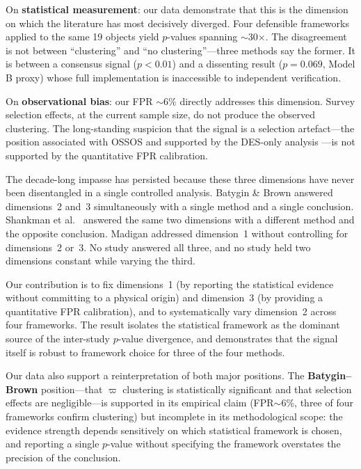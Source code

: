 \documentclass[12pt,a4paper]{article}
\begin{document}
On \textbf{statistical measurement}: our data demonstrate that this is the dimension on which the literature has most decisively diverged. Four defensible frameworks applied to the same 19 objects yield $p$-values spanning $\sim$30$\times$. The disagreement is not between ``clustering'' and ``no clustering''---three methods say the former. It is between a consensus signal ($p<0.01$) and a dissenting result ($p=0.069$, Model B proxy) whose full implementation is inaccessible to independent verification.

On \textbf{observational bias}: our FPR $\sim6\%$ directly addresses this dimension. Survey selection effects, at the current sample size, do not produce the observed clustering. The long-standing suspicion that the signal is a selection artefact---the position associated with OSSOS \cite{shankman2017} and supported by the DES-only analysis \cite{bernardinelli2020}---is not supported by the quantitative FPR calibration.

The decade-long impasse has persisted because these three dimensions have never been disentangled in a single controlled analysis. Batygin \& Brown \cite{batygin2016,brown2019} answered dimensions~2 and~3 simultaneously with a single method and a single conclusion. Shankman et al.\ \cite{shankman2017} answered the same two dimensions with a different method and the opposite conclusion. Madigan \cite{madigan2018} addressed dimension~1 without controlling for dimensions~2 or~3. No study answered all three, and no study held two dimensions constant while varying the third.

Our contribution is to fix dimensions~1 (by reporting the statistical evidence without committing to a physical origin) and dimension~3 (by providing a quantitative FPR calibration), and to systematically vary dimension~2 across four frameworks. The result isolates the statistical framework as the dominant source of the inter-study $p$-value divergence, and demonstrates that the signal itself is robust to framework choice for three of the four methods.

Our data also support a reinterpretation of both major positions. The \textbf{Batygin--Brown} position---that $\varpi$ clustering is statistically significant and that selection effects are negligible---is supported in its empirical claim (FPR$\sim$6\%, three of four frameworks confirm clustering) but incomplete in its methodological scope: the evidence strength depends sensitively on which statistical framework is chosen, and reporting a single $p$-value without specifying the framework overstates the precision of the conclusion.
\end{document}
